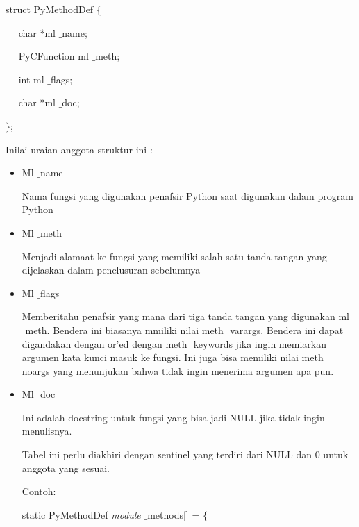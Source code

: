 \documentclass{wileySix}
\begin{document}
\begin{myEnumerate}
{\begin{myEnumerate}
struct PyMethodDef  $  \{  $ \par
\noindent 
~~ char *ml $  \_  $name; \par
\noindent 
~~ PyCFunction ml $  \_  $meth; \par
\noindent 
~~ int ml $  \_  $flags; \par
\noindent 
~~ char *ml $  \_  $doc; \par
\noindent 
$  \}  $; \par
\vspace{12pt}
\vspace{12pt}
\vspace{12pt}
\noindent 
Inilai uraian anggota struktur ini : \par
\noindent 
\begin{itemize}
	\item Ml $  \_  $name \par
	Nama fungsi yang digunakan penafsir Python saat digunakan dalam program Python \par
	\noindent 
	\item Ml $  \_  $meth \par
	Menjadi alamaat ke fungsi yang memiliki salah satu tanda tangan yang dijelaskan dalam penelusuran sebelumnya \par
	\noindent 
	\item Ml $  \_  $flags \par
	Memberitahu penafsir yang mana dari tiga tanda tangan yang digunakan ml $  \_  $meth. Bendera ini biasanya mmiliki nilai meth $  \_  $varargs. Bendera ini dapat digandakan dengan or’ed dengan meth $  \_  $keywords jika ingin memiarkan argumen kata kunci masuk ke fungsi. Ini juga bisa memiliki nilai meth $  \_  $noargs yang menunjukan bahwa tidak ingin menerima argumen apa pun. \par
	\noindent 
	\item Ml $  \_  $doc \par
	Ini adalah docstring untuk fungsi yang bisa jadi NULL jika tidak ingin menulisnya. \par
	\vspace{12pt}
	\vspace{12pt}
	\noindent 
	\hspace*{0.5in} Tabel ini perlu diakhiri dengan sentinel yang terdiri dari NULL dan 0 untuk anggota yang sesuai. \par
	\vspace{12pt}
	\noindent 
	Contoh: \par
	\noindent 
	static PyMethodDef \textit{module} $  \_  $methods[] =  $  \{  $ \par

\end{itemize}
\end{myEnumerate}}
\end{myEnumerate}
\end{document}
